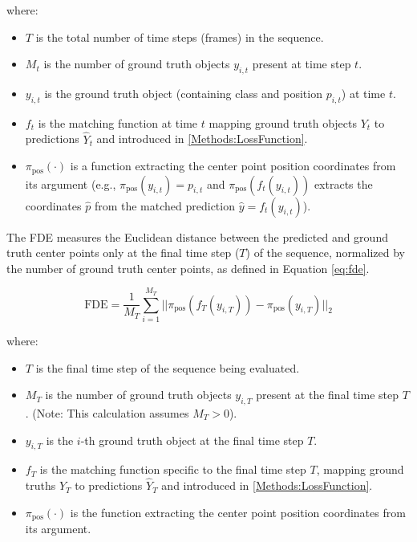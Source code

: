 where:
\begin{itemize}
    \item $T$ is the total number of time steps (frames) in the sequence.
    \item $M_t$ is the number of ground truth objects $y_{i,t}$ present at time step $t$.
    \item $y_{i,t}$ is the ground truth object (containing class and position $p_{i,t}$) at time $t$.
    \item $f_t$ is the matching function at time $t$ mapping ground truth objects $Y_t$ to predictions $\hat{Y}_t$ and introduced in \ref{Methods:LossFunction}.
    \item $\pi_{\text{pos}}(\cdot)$ is a function extracting the center point position coordinates from its argument (e.g., $\pi_{\text{pos}}(y_{i,t}) = p_{i,t}$ and $\pi_{\text{pos}}(f_t(y_{i,t}))$ extracts the coordinates $\hat{p}$ from the matched prediction $\hat{y}=f_t(y_{i,t})$).
\end{itemize}


The FDE measures the Euclidean distance between the predicted and ground truth center points only at the final time step ($T$) of the sequence, normalized by the number of ground truth center points, as defined in Equation \ref{eq:fde}.

\begin{equation}
    \text{FDE} = \frac{1}{M_T} \sum_{i=1}^{M_T} || \pi_{\text{pos}}(f_T(y_{i,T})) - \pi_{\text{pos}}(y_{i,T}) ||_2
    \label{eq:fde}
\end{equation}

where:
\begin{itemize}
    \item $T$ is the final time step of the sequence being evaluated.
    \item $M_T$ is the number of ground truth objects $y_{i,T}$ present at the final time step $T$. (Note: This calculation assumes $M_T > 0$).
    \item $y_{i,T}$ is the $i$-th ground truth object at the final time step $T$.
    \item $f_T$ is the matching function specific to the final time step $T$, mapping ground truths $Y_T$ to predictions $\hat{Y}_T$ and introduced in \ref{Methods:LossFunction}.
    \item $\pi_{\text{pos}}(\cdot)$ is the function extracting the center point position coordinates from its argument.
\end{itemize}

